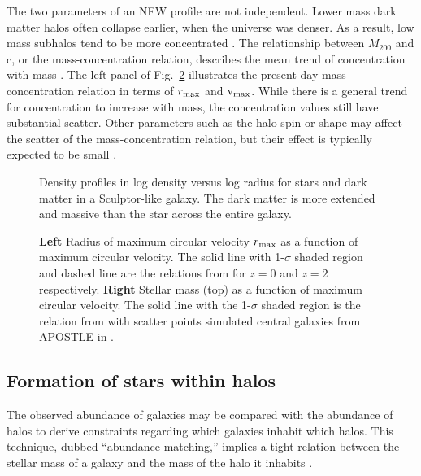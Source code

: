 The two parameters of an NFW profile are not independent. Lower mass
dark matter halos often collapse earlier, when the universe was denser.
As a result, low mass subhalos tend to be more concentrated
\citep[e.g.,][]{NFW1997}. The relationship between \(M_{200}\) and c, or
the mass-concentration relation, describes the mean trend of
concentration with mass \citep[e.g.,][]{bullock+2001, ludlow+2016}. The
left panel of Fig.~\ref{fig:smhm} illustrates the present-day
mass-concentration relation in terms of \(r_{\rm max}\) and
\({\rm v}_{\rm max}\). While there is a general trend for concentration to
increase with mass, the concentration values still have substantial
scatter. Other parameters such as the halo spin or shape may affect the
scatter of the mass-concentration relation, but their effect is
typically expected to be small
\citep{navarro+2010, dicintio+2013, dutton+maccio2014}.

\begin{figure}
\centering
{}
\caption[Example density profiles]{Density profiles in log density
versus log radius for stars and dark matter in a Sculptor-like galaxy.
The dark matter is more extended and massive than the star across the
entire galaxy.}\label{fig:nfw_density}
\end{figure}

\begin{figure}
\centering
{}
\caption[Stellar-mass halo-mass relation]{\textbf{Left} Radius of
maximum circular velocity \(r_{\rm max}\) as a function of maximum
circular velocity. The solid line with 1-\(\sigma\) shaded region and
dashed line are the relations from \citet{ludlow+2016} for \(z=0\) and
\(z=2\) respectively. \textbf{Right} Stellar mass (top) as a function of
maximum circular velocity. The solid line with the 1-\(\sigma\) shaded
region is the relation from \citet{fattahi+2018} with scatter points
simulated central galaxies from APOSTLE in
\citet{fattahi+2018}.}\label{fig:smhm}
\end{figure}

\subsection{\texorpdfstring{Formation of stars within
\LCDM halos}{Formation of stars within halos}}\label{formation-of-stars-within-halos}

The observed abundance of galaxies may be compared with the abundance of
\LCDM halos to derive constraints regarding which galaxies inhabit which
halos. This technique, dubbed ``abundance matching,'' implies a tight
relation between the stellar mass of a galaxy and the mass of the halo
it inhabits \citep{li+white, moster+naab+white2013}.

